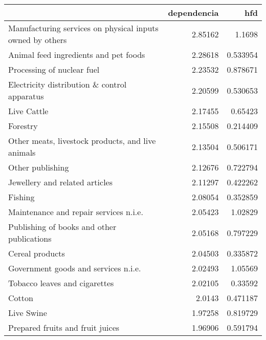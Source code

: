 \begin{tabular}{lrr}
\hline

\hline
                                                           &   dependencia &         hfd \\
\hline
 Manufacturing services on physical inputs owned by others &   2.85162     & 1.1698      \\
 Animal feed ingredients and pet foods                     &   2.28618     & 0.533954    \\
 Processing of nuclear fuel                                &   2.23532     & 0.878671    \\
 Electricity distribution \& control apparatus              &   2.20599     & 0.530653    \\
 Live Cattle                                               &   2.17455     & 0.65423     \\
 Forestry                                                  &   2.15508     & 0.214409    \\
 Other meats, livestock products, and live animals         &   2.13504     & 0.506171    \\
 Other publishing                                          &   2.12676     & 0.722794    \\
 Jewellery and related articles                            &   2.11297     & 0.422262    \\
 Fishing                                                   &   2.08054     & 0.352859    \\
 Maintenance and repair services n.i.e.                    &   2.05423     & 1.02829     \\
 Publishing of books and other publications                &   2.05168     & 0.797229    \\
 Cereal products                                           &   2.04503     & 0.335872    \\
 Government goods and services n.i.e.                      &   2.02493     & 1.05569     \\
 Tobacco leaves and cigarettes                             &   2.02105     & 0.33592     \\
 Cotton                                                    &   2.0143      & 0.471187    \\
 Live Swine                                                &   1.97258     & 0.819729    \\
 Prepared fruits and fruit juices                          &   1.96906     & 0.591794    \\

\end{tabular}
